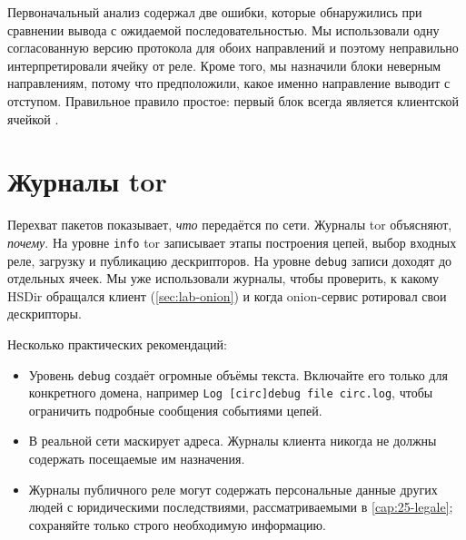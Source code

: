 \begin{attenzione}
Первоначальный анализ содержал две ошибки, которые обнаружились при сравнении вывода с ожидаемой последовательностью. Мы использовали одну согласованную версию протокола для обоих направлений и поэтому неправильно интерпретировали ячейку  от реле. Кроме того, мы назначили блоки неверным направлениям, потому что предположили, какое именно направление  выводит с отступом. Правильное правило простое: первый блок всегда является клиентской ячейкой .
\end{attenzione}

\section{Журналы tor}\label{sec:traffico-log}

Перехват пакетов показывает, \emph{что} передаётся по сети. Журналы tor объясняют, \emph{почему}. На уровне \texttt{info} tor записывает этапы построения цепей, выбор входных реле, загрузку и публикацию дескрипторов. На уровне \texttt{debug} записи доходят до отдельных ячеек. Мы уже использовали журналы, чтобы проверить, к какому HSDir обращался клиент (\cref{sec:lab-onion}) и когда onion-сервис ротировал свои дескрипторы.

Несколько практических рекомендаций:
\begin{itemize}
  \item Уровень \texttt{debug} создаёт огромные объёмы текста. Включайте его только для конкретного домена, например \texttt{Log [circ]debug file circ.log}, чтобы ограничить подробные сообщения событиями цепей.
  \item В реальной сети  маскирует адреса. Журналы клиента никогда не должны содержать посещаемые им назначения.
  \item Журналы публичного реле могут содержать персональные данные других людей с юридическими последствиями, рассматриваемыми в \cref{cap:25-legale}; сохраняйте только строго необходимую информацию.
\end{itemize}

